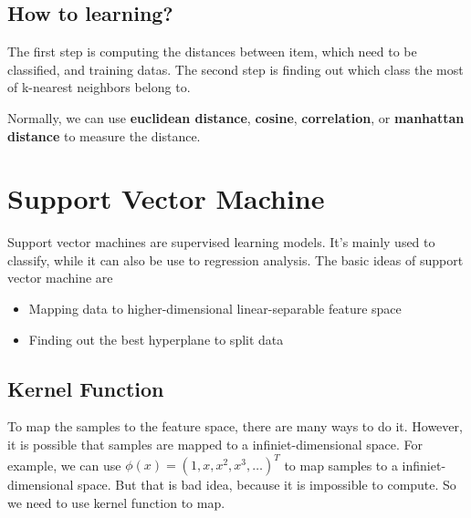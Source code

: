 \documentclass{article}
\begin{document}
\subsection{How to learning?}
\label{sec:knn:learning}

The first step is computing the distances between item, which need to be classified, and training datas.
The second step is finding out which class the most of k-nearest neighbors belong to.

Normally, we can use \textbf{euclidean distance}, \textbf{cosine}, \textbf{correlation},
or \textbf{manhattan distance} to measure the distance.

\section{Support Vector Machine}
\label{sec:svm}

Support vector machines are supervised learning models\cite{svm-wikipedia}. It's mainly used to classify,
while it can also be use to regression analysis.
The basic ideas of support vector machine are
\begin{itemize}
\item Mapping data to higher-dimensional linear-separable feature space
\item Finding out the best hyperplane to split data
\end{itemize}

\subsection{Kernel Function}
\label{sec:svm:kf}

To map the samples to the feature space, there are many ways to do it.
However, it is possible that samples are mapped to a infiniet-dimensional space.
For example, we can use $\phi(x)=(1,x,x^2,x^3,\dots)^T$ to map samples to a infiniet-dimensional space.
But that is bad idea, because it is impossible to compute.
So we need to use kernel function to map.
\end{document}
